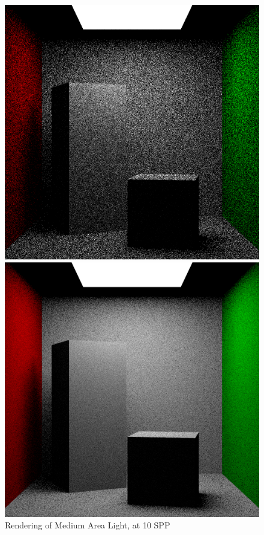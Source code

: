 \documentclass[a4paper]{myarticle}
\begin{document}
\begin{figure}[H]
  \begin{minipage}[t]{.3\textwidth}
      \centering
      \includegraphics[width=\textwidth]{q3/med_0_10.png}
      \caption{Rendering of Medium Area Light, at 10 SPP}
  \end{minipage}
  \hfill
  \begin{minipage}[t]{.3\textwidth}
      \centering
      \includegraphics[width=\textwidth]{q3/med_0_100.png}

\end{minipage}
\end{figure}
\end{document}
